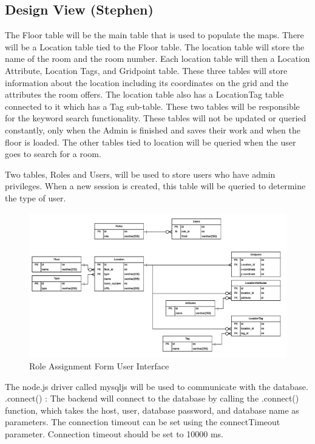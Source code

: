 \documentclass[letterpaper,10pt,titlepage, onecolumn, compsoc]{IEEEtran}
\begin{document}
\subsection{Design View (Stephen)}
The Floor table will be the main table that is used to populate the maps. There will be a Location table tied to the Floor table. The location table will store the name of the room and the room number. Each location table will then a Location Attribute, Location Tags, and Gridpoint table. These three tables will store information about the location including its coordinates on the grid and the attributes the room offers. The location table also has a LocationTag table connected to it which has a Tag sub-table. These two tables will be responsible for the keyword search functionality.  These tables will not be updated or queried constantly, only when the Admin is finished and saves their work and when the floor is loaded. The other tables tied to location will be queried when the user goes to search for a room. 

Two tables, Roles and Users, will be used to store users who have admin privileges. When a new session is created, this table will be queried to determine the type of user.

\begin{figure}[h!]
\centering
\hspace*{-.5in}
\includegraphics[scale=.65\textwidth,natwidth=1298,natheight=732]{images/libnav-database-schema.png}
\caption{Role Assignment Form User Interface}
\label{fig:method}
\end{figure}

The node.js driver called mysqljs will be used to communicate with the database.
.connect() : The backend will connect to the database by calling the .connect() function, which takes the host, user, database password, and database name as parameters. The connection timeout can be set using the connectTimeout parameter. Connection timeout should be set to 10000 ms.
\end{document}
